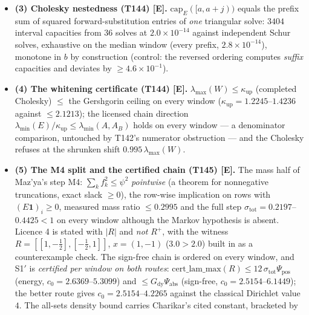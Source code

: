 \documentclass[11pt]{article}
\providecommand{\mE}{\textbf{[E]}}\providecommand{\mC}{\textbf{[C]}}
\begin{document}
\begin{itemize}[leftmargin=1.5em]
equals $v^{\mathsf T}(K^{-1}-H)v/v^{\mathsf T}K^{-1}v$ for \emph{every} $v$ ($9.5\times10^{-14}$ on
$24$ random vectors per window), reproduces $1-\rho(W)$ at the exact top eigenvector
($1.7\times10^{-9}$ under the \emph{declared} $1/\mathrm{gap}$ conditioning bar
$5.4\times10^{-8}$), and every random quotient stays $\ge1-\rho(W)$; on the constant vector the
whole denominator \emph{is} the capacity term (controls: dropping it, rel $=1$; the $|N|$ crossing
kernel, $2.6\times10^{-1}$).
\item \textbf{(3) Cholesky nestedness (T144) \mE.} $\mathrm{cap}_E([a,a{+}j))$ equals the prefix sum
of squared forward-substitution entries of \emph{one} triangular solve: $3404$ interval capacities
from $36$ solves at $2.0\times10^{-14}$ against independent Schur solves, exhaustive on the median
window (every prefix, $2.8\times10^{-14}$), monotone in $b$ by construction (control: the reversed
ordering computes \emph{suffix} capacities and deviates by $\ge4.6\times10^{-1}$).
\item \textbf{(4) The whitening certificate (T144) \mE.} $\lambda_{\max}(W)\le\kappa_{\mathrm{up}}$
(completed Cholesky) $\le$ the Gershgorin ceiling on every window
($\kappa_{\mathrm{up}}=1.2245$--$1.4236$ against $\le2.1213$); the licensed chain direction
$\lambda_{\min}(E)/\kappa_{\mathrm{up}}\le\lambda_{\min}(A,A_B)$ holds on every window --- a
denominator comparison, untouched by T142's numerator obstruction --- and the Cholesky refuses at
the shrunken shift $0.995\,\lambda_{\max}(W)$.
\item \textbf{(5) The M4 split and the certified chain (T145) \mE.} The mass half of Maz'ya's step
M4: $\sum_kf_k^2\le\psi^2$ \emph{pointwise} (a theorem for nonnegative truncations, exact slack
$\ge0$), the row-wise implication on rows with $(E\mathbf 1)_i\ge0$, measured mass ratio $\le0.2995$
and the full step $\sigma_{\mathrm{tot}}=0.2197$--$0.4425<1$ on every window although the Markov
hypothesis is absent. Licence 4 is stated with $|R|$ and \emph{not} $R^{+}$, with the witness
$R=[[1,-\tfrac12],[-\tfrac12,1]]$, $x=(1,-1)$ ($3.0>2.0$) built in as a counterexample check. The
sign-free chain is ordered on every window, and S1$'$ is \emph{certified per window on both routes}:
$\mathrm{cert\_lam\_max}(R)\le12\,\sigma_{\mathrm{tot}}\Psi_{\mathrm{pos}}$ (energy,
$c_0=2.6369$--$5.3099$) and $\le G_{\mathrm{dy}}\Psi_{\mathrm{abs}}$ (sign-free,
$c_0=2.5154$--$6.1449$); the better route gives $c_0=2.5154$--$4.2265$ against the classical
Dirichlet value $4$. The all-sets density bound carries Charikar's cited constant, bracketed by

\end{itemize}
\end{document}
